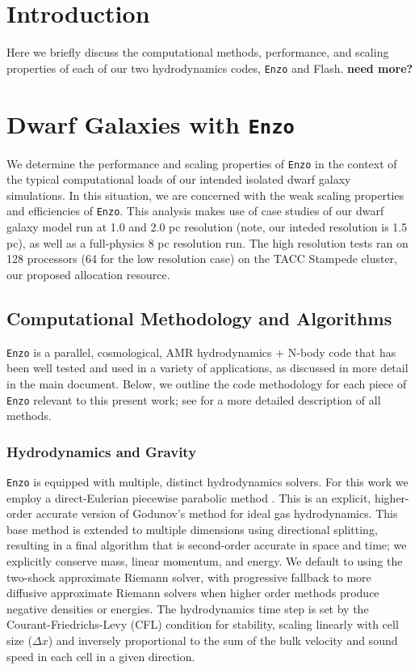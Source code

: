 \documentclass[11pt]{article}
\date{\vspace{-10ex}}
\begin{document}
\maketitle

\section{Introduction}
Here we briefly discuss the computational methods, performance, and scaling properties of each of our two hydrodynamics codes, \texttt{Enzo} and Flash. {\bf need more?}

\section{Dwarf Galaxies with \texttt{Enzo}}

We determine the performance and scaling properties of \texttt{Enzo} in the context of the typical computational loads of our intended isolated dwarf galaxy simulations. In this situation, we are concerned with the weak scaling properties and efficiencies of \texttt{Enzo}. This analysis makes use of case studies of our dwarf galaxy model run at 1.0 and 2.0 pc resolution (note, our inteded resolution is 1.5 pc), as well as a full-physics 8 pc resolution run. The high resolution tests ran on 128 processors (64 for the low resolution case) on the TACC Stampede cluster, our proposed allocation resource.

\subsection{Computational Methodology and Algorithms}

\texttt{Enzo} is a parallel, cosmological, AMR hydrodynamics + N-body code that has been well tested and used in a variety of applications, as discussed in more detail in the main document. Below, we outline the code methodology for each piece of \texttt{Enzo} relevant to this present work; see \cite{Enzo2014} for a more detailed description of all methods. 

\subsubsection{Hydrodynamics and Gravity}

\texttt{Enzo} is equipped with multiple, distinct hydrodynamics solvers. For this work we employ a direct-Eulerian piecewise parabolic method \citep{ColellaWoodward1984, Bryan1995}. This is an explicit, higher-order accurate version of Godunov's method for ideal gas hydrodynamics. This base method is extended to multiple dimensions using directional splitting, resulting in a final algorithm that is second-order accurate in space and time; we explicitly conserve mass, linear momentum, and energy. We default to using the two-shock approximate Riemann solver, with progressive fallback to more diffusive approximate Riemann solvers when higher order methods produce negative densities or energies. The hydrodynamics time step is set by the Courant-Friedrichs-Levy (CFL) condition for stability, scaling linearly with cell size ($\Delta x$) and inversely proportional to the sum of the bulk velocity and sound speed in each cell in a given direction. 
\end{document}
